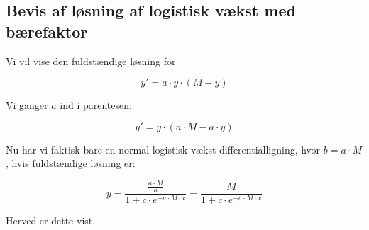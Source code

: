 \documentclass{article}
\makeatletter
\newenvironment{proofw}{\par
  \pushQED{\qed}%
  \normalfont \topsep6\p@\@plus6\p@\relax
  \trivlist
  \item[]\ignorespaces
}{%
  \popQED\endtrivlist\@endpefalse
}
\makeatother
\begin{document}
\subsection{Bevis af løsning af logistisk vækst med bærefaktor}

\begin{proofw}
    
Vi vil vise den fuldstændige løsning for 

$$y'=a \cdot y \cdot (M-y)$$

Vi ganger $a$ ind i parentesen:

$$y'=y \cdot (a\cdot M-a \cdot y)$$

Nu har vi faktisk bare en normal logistisk vækst differentialligning,
hvor $b=a \cdot M$, hvis fuldstændige løsning er:

$$
    y=\frac{
\frac{a \cdot M}{a}
    }{
        1+c \cdot e^{-a\cdot M \cdot x}
    }=
    \frac{
M
    }{
        1+c \cdot e^{-a\cdot M \cdot x}
    }
$$

Herved er dette vist.

\end{proofw}
\end{document}
